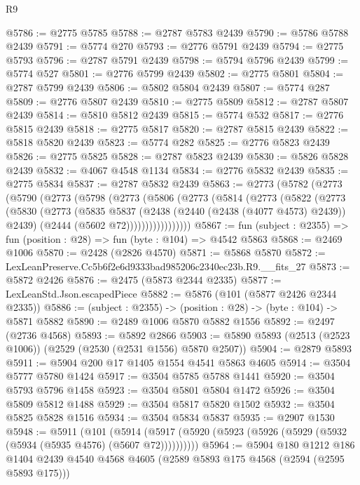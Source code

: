 \begin{lexlean}{R9}
\begin{coremodule}
@5786 := @2775 @5785
@5788 := @2787 @5783 @2439
@5790 := @5786 @5788 @2439
@5791 := @5774 @270
@5793 := @2776 @5791 @2439
@5794 := @2775 @5793
@5796 := @2787 @5791 @2439
@5798 := @5794 @5796 @2439
@5799 := @5774 @527
@5801 := @2776 @5799 @2439
@5802 := @2775 @5801
@5804 := @2787 @5799 @2439
@5806 := @5802 @5804 @2439
@5807 := @5774 @287
@5809 := @2776 @5807 @2439
@5810 := @2775 @5809
@5812 := @2787 @5807 @2439
@5814 := @5810 @5812 @2439
@5815 := @5774 @532
@5817 := @2776 @5815 @2439
@5818 := @2775 @5817
@5820 := @2787 @5815 @2439
@5822 := @5818 @5820 @2439
@5823 := @5774 @282
@5825 := @2776 @5823 @2439
@5826 := @2775 @5825
@5828 := @2787 @5823 @2439
@5830 := @5826 @5828 @2439
@5832 := @4067 @4548 @1134
@5834 := @2776 @5832 @2439
@5835 := @2775 @5834
@5837 := @2787 @5832 @2439
@5863 := @2773
    (@5782
      (@2773
        (@5790
          (@2773
            (@5798
              (@2773
                (@5806
                  (@2773
                    (@5814
                      (@2773
                        (@5822
                          (@2773
                            (@5830
                              (@2773
                                (@5835
                                  @5837
                                  (@2438 (@2440 (@2438 (@4077 @4573) @2439)) @2439)
                                  (@2444 (@5602 @72)))))))))))))))))
@5867 := fun (subject : @2355) => fun (position : @28) => fun (byte : @104) => @4542 @5863
@5868 := @2469 @1006
@5870 := @2428 (@2826 @4570)
@5871 := @5868 @5870
@5872 := LexLeanPreserve.Cc5b6f2e6d9333bad985206c2340ec23b.R9.__fits_27
@5873 := @5872 @2426
@5876 := @2475 (@5873 @2344 @2335)
@5877 := LexLeanStd.Json.escapedPiece
@5882 := @5876 (@101 (@5877 @2426 @2344 @2335))
@5886 := (subject : @2355) -> (position : @28) -> (byte : @104) -> @5871 @5882
@5890 := @2489 @1006 @5870 @5882 @1556
@5892 := @2497 (@2736 @4568)
@5893 := @5892 @2866
@5903 := @5890 @5893 (@2513 (@2523 @1006)) (@2529 (@2530 (@2531 @1556) @5870 @2507))
@5904 := @2879 @5893
@5911 := @5904 @200 @17 @1405 @1554 @4541 @5863 @4605
@5914 := @3504 @5777 @5780 @1424
@5917 := @3504 @5785 @5788 @1441
@5920 := @3504 @5793 @5796 @1458
@5923 := @3504 @5801 @5804 @1472
@5926 := @3504 @5809 @5812 @1488
@5929 := @3504 @5817 @5820 @1502
@5932 := @3504 @5825 @5828 @1516
@5934 := @3504 @5834 @5837
@5935 := @2907 @1530
@5948 := @5911
    (@101 (@5914 (@5917 (@5920 (@5923 (@5926 (@5929 (@5932 (@5934 (@5935 @4576) (@5607 @72))))))))))
@5964 := @5904
    @180
    @1212
    @186
    @1404
    @2439
    @4540
    @4568
    @4605
    (@2589 @5893 @175 @4568 (@2594 (@2595 @5893 @175)))

\end{coremodule}
\end{lexlean}
